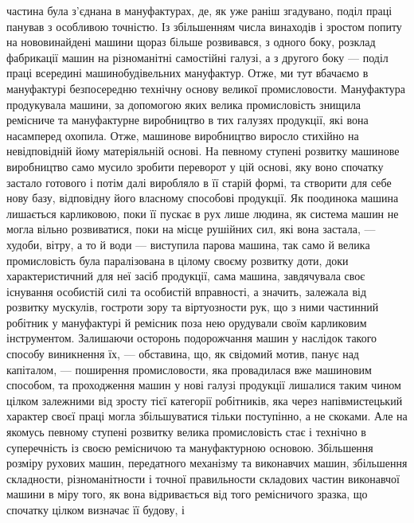 \parcont{}  %
частина була з’єднана в мануфактурах, де, як уже раніш згадувано,
поділ праці панував з особливою точністю. Із збільшенням числа
винаходів і зростом попиту на нововинайдені машини щораз
більше розвивався, з одного боку, розклад фабрикації машин на
різноманітні самостійні галузі, а з другого боку — поділ праці
всередині машинобудівельних мануфактур. Отже, ми тут вбачаємо
в мануфактурі безпосередню технічну основу великої промисловости.
Мануфактура продукувала машини, за допомогою яких
велика промисловість знищила ремісниче та мануфактурне виробництво
в тих галузях продукції, які вона насамперед охопила.
Отже, машинове виробництво виросло стихійно на невідповідній
йому матеріяльній основі. На певному ступені розвитку машинове
виробництво само мусило зробити переворот у цій основі, яку воно
спочатку застало готового і потім далі виробляло в її старій формі,
та створити для себе нову базу, відповідну його власному способові
продукції. Як поодинока машина лишається карликовою, поки
її пускає в рух лише людина, як система машин не могла вільно
розвиватися, поки на місце рушійних сил, які вона застала, —
худоби, вітру, а то й води — виступила парова машина, так само
й велика промисловість була паралізована в цілому своєму розвитку
доти, доки характеристичний для неї засіб продукції,
сама машина, завдячувала своє існування особистій силі та особистій
вправності, а значить, залежала від розвитку мускулів,
гостроти зору та віртуозности рук, що з ними частинний робітник
у мануфактурі й ремісник поза нею орудували своїм карликовим
інструментом. Залишаючи осторонь подорожчання машин у
наслідок такого способу виникнення їх, — обставина, що, як свідомий
мотив, панує над капіталом, — поширення промисловости,
яка провадилася вже машиновим способом, та проходження машин
у нові галузі продукції лишалися таким чином цілком залежними
від зросту тієї категорії робітників, яка через напівмистецький
характер своєї праці могла збільшуватися тільки поступінно,
а не скоками. Але на якомусь певному ступені розвитку велика
промисловість стає і технічно в суперечність із своєю ремісничою
та мануфактурною основою. Збільшення розміру рухових
машин, передатного механізму та виконавчих машин, збільшення
складности, різноманітности і точної правильности складових
частин виконавчої машини в міру того, як вона відривається від
того ремісничого зразка, що спочатку цілком визначає її будову, і
